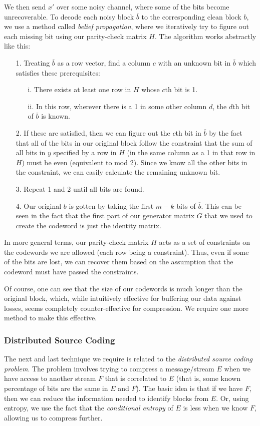 \documentclass[11pt]{article}
\begin{document}
We then send $x'$ over some noisy channel, where some of the bits become unrecoverable. 
To decode each noisy block $\overline{b}$ to the corresponding clean block $b$, 
we use a method called \emph{belief propagation}, 
where we iteratively try to figure out each missing bit using our parity-check matrix $H$. 
The algorithm works abstractly like this:
\begin{itemize}
	\item[1.]Treating $\overline{b}$ as a row vector, find a column $c$ with an unknown bit in $\overline{b}$ 
which satisfies these prerequisites:
	\begin{itemize}
		\item[i.]There exists at least one row in $H$ whose $c$th bit is 1.
		\item[ii.]In this row, wherever there is a 1 in some other column $d$, the $d$th bit of $\overline{b}$ is known. 
	\end{itemize}
	\item[2.]If these are satisfied, then we can figure out the $c$th bit in $\overline{b}$ by the fact that all of the 
bits in our original block follow the constraint that the sum of all bits in $y$ specified by a row in $H$ 
(in the same column as a 1 in that row in $H$) must be even (equivalent to mod 2). 
Since we know all the other bits in the constraint, we can easily calculate the remaining unknown bit.
	\item[3.]Repeat 1 and 2 until all bits are found.
	\item[4.]Our original $b$ is gotten by taking the first $m-k$ bits of $\overline{b}$. 
This can be seen in the fact that the first part of our generator matrix $G$ that we used to create 
the codeword is just the identity matrix.
\end{itemize}
In more general terms, our parity-check matrix $H$ acts as a set of constraints on the codewords we are 
allowed (each row being a constraint). Thus, even if some of the bits are lost, we can recover them based on the assumption that 
the codeword must have passed the constraints. 

Of course, one can see that the size of our codewords 
is much longer than the original block, which, 
while intuitively effective for buffering our data against losses, seems completely counter-effective for compression. 
We require one more method to make this effective. 

\subsubsection{Distributed Source Coding}\label{distributed-source-coding-subsubsect}
The next and last technique we require is related to the \emph{distributed source coding problem}\cite{johnson}. 
The problem involves trying to compress a message/stream $E$ when we have access to another stream $F$ 
that is correlated to $E$ (that is, some known percentage of bits are the same in $E$ and $F$). 
The basic idea is that if we have $F$, then we can reduce the information 
needed to identify blocks from $E$. Or, using entropy, 
we use the fact that the \emph{conditional entropy} of $E$ is less when we know $F$, 
allowing us to compress further. 
\end{document}
